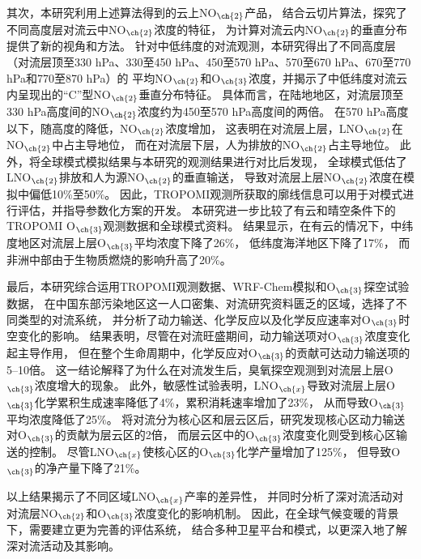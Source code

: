 {其次，本研究利用上述算法得到的云上NO$_{\ch{2}}$产品，
结合云切片算法，探究了不同高度层对流云中NO$_{\ch{2}}$浓度的特征，
为计算对流云内NO$_{\ch{2}}$的垂直分布提供了新的视角和方法。
针对中低纬度的对流观测，本研究得出了不同高度层（对流层顶至330 hPa、330至450 hPa、450至570 hPa、570至670 hPa、670至770 hPa和770至870 hPa）的
平均NO$_{\ch{2}}$和O$_{\ch{3}}$浓度，并揭示了中低纬度对流云内呈现出的“C”型NO$_{\ch{2}}$垂直分布特征。
具体而言，在陆地地区，对流层顶至330 hPa高度间的NO$_{\ch{2}}$浓度约为450至570 hPa高度间的两倍。
在570 hPa高度以下，随高度的降低，NO$_{\ch{2}}$浓度增加，
这表明在对流层上层，LNO$_{\ch{2}}$在NO$_{\ch{2}}$中占主导地位，
而在对流层下层，人为排放的NO$_{\ch{2}}$占主导地位。
此外，将全球模式模拟结果与本研究的观测结果进行对比后发现，
全球模式低估了LNO$_{\ch{2}}$排放和人为源NO$_{\ch{2}}$的垂直输送，
导致对流层上层NO$_{\ch{2}}$浓度在模拟中偏低10\%至50\%。
因此，TROPOMI观测所获取的廓线信息可以用于对模式进行评估，并指导参数化方案的开发。
本研究进一步比较了有云和晴空条件下的TROPOMI O$_{\ch{3}}$观测数据和全球模式资料。
结果显示，在有云的情况下，中纬度地区对流层上层O$_{\ch{3}}$平均浓度下降了26\%，
低纬度海洋地区下降了17\%，
而非洲中部由于生物质燃烧的影响升高了20\%。

最后，本研究综合运用TROPOMI观测数据、WRF-Chem模拟和O$_{\ch{3}}$探空试验数据，
在中国东部污染地区这一人口密集、对流研究资料匮乏的区域，选择了不同类型的对流系统，
并分析了动力输送、化学反应以及化学反应速率对O$_{\ch{3}}$时空变化的影响。
结果表明，尽管在对流旺盛期间，动力输送项对O$_{\ch{3}}$浓度变化起主导作用，
但在整个生命周期中，化学反应对O$_{\ch{3}}$的贡献可达动力输送项的5--10倍。
这一结论解释了为什么在对流发生后，臭氧探空观测到对流层上层O$_{\ch{3}}$浓度增大的现象。
此外，敏感性试验表明，LNO$_{\ch{x}}$导致对流层上层O$_{\ch{3}}$化学累积生成速率降低了4\%，累积消耗速率增加了23\%，
从而导致O$_{\ch{3}}$平均浓度降低了25\%。
将对流分为核心区和层云区后，研究发现核心区动力输送对O$_{\ch{3}}$的贡献为层云区的2倍，
而层云区中的O$_{\ch{3}}$浓度变化则受到核心区输送的控制。
尽管LNO$_{\ch{x}}$使核心区的O$_{\ch{3}}$化学产量增加了125\%，
但导致O$_{\ch{3}}$的净产量下降了21\%。

以上结果揭示了不同区域LNO$_{\ch{x}}$产率的差异性，
并同时分析了深对流活动对对流层NO$_{\ch{2}}$和O$_{\ch{3}}$浓度变化的影响机制。
因此，在全球气候变暖的背景下，需要建立更为完善的评估系统，
结合多种卫星平台和模式，以更深入地了解深对流活动及其影响。
}
